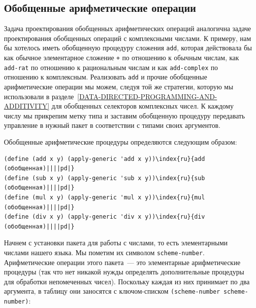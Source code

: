 \subsection{Обобщенные арифметические операции}
\label{GENERIC-ARITHMETIC-OPERATIONS}


Задача проектирования обобщенных
арифметических операций 
аналогична задаче проектирования обобщенных операций с комплексными
числами.  К примеру, нам бы хотелось иметь обобщенную процедуру
сложения  {\tt add}, которая действовала бы как обычное
элементарное сложение {\tt +} по отношению к обычным числам,
как {\tt add-rat} по отношению к рациональным числам и как
{\tt add-complex} по отношению к комплексным.  Реализовать 
{\tt add}
и прочие обобщенные арифметические операции мы можем, следуя той же
стратегии, которую мы использовали в 
разделе~\ref{DATA-DIRECTED-PROGRAMMING-AND-ADDITIVITY} для
обобщенных селекторов комплексных чисел.  К каждому
числу мы прикрепим метку типа и заставим обобщенную процедуру
передавать управление в нужный пакет в соответствии с типами
своих аргументов.

Обобщенные арифметические процедуры определяются
следующим образом:

\begin{Verbatim}[fontsize=\small]
(define (add x y) (apply-generic 'add x y))\index{ru}{add (обобщенная)||||pd|}
(define (sub x y) (apply-generic 'sub x y))\index{ru}{sub (обобщенная)||||pd|}
(define (mul x y) (apply-generic 'mul x y))\index{ru}{mul (обобщенная)||||pd|}
(define (div x y) (apply-generic 'div x y))\index{ru}{div (обобщенная)||||pd|}
\end{Verbatim}

Начнем с установки пакета для работы с
числами, то есть элементарными числами нашего
языка. Мы пометим их символом  {\tt scheme-num\-ber}.
Арифметические операции этого пакета~--- это элементарные
арифметические процедуры (так что нет никакой нужды определять
дополнительные процедуры для обработки непомеченных чисел).  Поскольку
каждая из них принимает по два аргумента, в таблицу они заносятся с
ключом-списком {\tt (scheme-number scheme-number)}:

